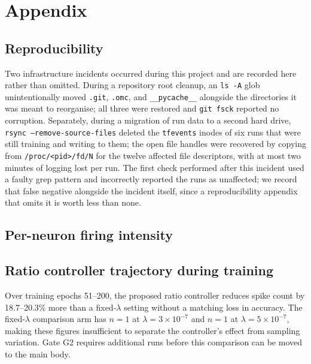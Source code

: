 \section{Appendix}
\label{sec:appendix}

\subsection{Reproducibility}
\label{sec:appendix-repro}

Two infrastructure incidents occurred during this project and are recorded here rather
than omitted. During a repository root cleanup, an \texttt{ls -A} glob unintentionally
moved \texttt{.git}, \texttt{.omc}, and \texttt{\_\_pycache\_\_} alongside the
directories it was meant to reorganise; all three were restored and \texttt{git fsck}
reported no corruption. Separately, during a migration of run data to a second hard
drive, \texttt{rsync --remove-source-files} deleted the \texttt{tfevents} inodes of six
runs that were still training and writing to them; the open file handles were recovered
by copying from \texttt{/proc/<pid>/fd/N} for the twelve affected file descriptors, with
at most two minutes of logging lost per run. The first check performed after this
incident used a faulty grep pattern and incorrectly reported the runs as unaffected; we
record that false negative alongside the incident itself, since a reproducibility
appendix that omits it is worth less than none.

\subsection{Per-neuron firing intensity}
\label{sec:appendix-intensity}



\subsection{Ratio controller trajectory during training}
\label{sec:appendix-trajectory}

Over training epochs 51--200, the proposed ratio controller reduces spike count by
18.7--20.3\% more than a fixed-$\lambda$ setting without a matching loss in accuracy.
The fixed-$\lambda$ comparison arm has $n=1$ at $\lambda=3\times10^{-7}$ and $n=1$ at
$\lambda=5\times10^{-7}$, making these figures insufficient to separate the controller's
effect from sampling variation. Gate G2 requires additional runs before
this comparison can be moved to the main body.
